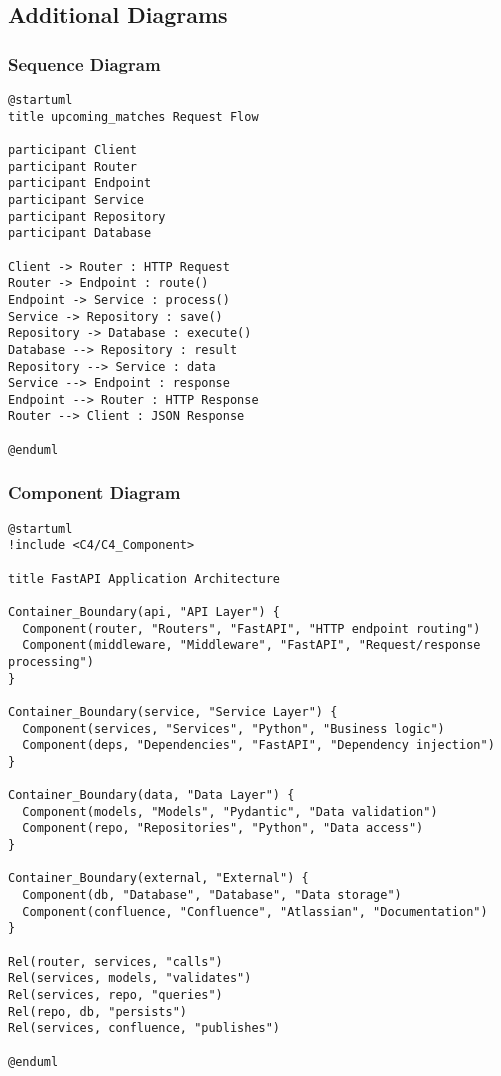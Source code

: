 \documentclass[11pt,a4paper]{article}
\begin{document}
\subsection{Additional Diagrams}

\subsubsection{Sequence Diagram}

\begin{verbatim}
@startuml
title upcoming_matches Request Flow

participant Client
participant Router
participant Endpoint
participant Service
participant Repository
participant Database

Client -> Router : HTTP Request
Router -> Endpoint : route()
Endpoint -> Service : process()
Service -> Repository : save()
Repository -> Database : execute()
Database --> Repository : result
Repository --> Service : data
Service --> Endpoint : response
Endpoint --> Router : HTTP Response
Router --> Client : JSON Response

@enduml
\end{verbatim}
\subsubsection{Component Diagram}

\begin{verbatim}
@startuml
!include <C4/C4_Component>

title FastAPI Application Architecture

Container_Boundary(api, "API Layer") {
  Component(router, "Routers", "FastAPI", "HTTP endpoint routing")
  Component(middleware, "Middleware", "FastAPI", "Request/response processing")
}

Container_Boundary(service, "Service Layer") {
  Component(services, "Services", "Python", "Business logic")
  Component(deps, "Dependencies", "FastAPI", "Dependency injection")
}

Container_Boundary(data, "Data Layer") {
  Component(models, "Models", "Pydantic", "Data validation")
  Component(repo, "Repositories", "Python", "Data access")
}

Container_Boundary(external, "External") {
  Component(db, "Database", "Database", "Data storage")
  Component(confluence, "Confluence", "Atlassian", "Documentation")
}

Rel(router, services, "calls")
Rel(services, models, "validates")
Rel(services, repo, "queries")
Rel(repo, db, "persists")
Rel(services, confluence, "publishes")

@enduml
\end{verbatim}
\end{document}
